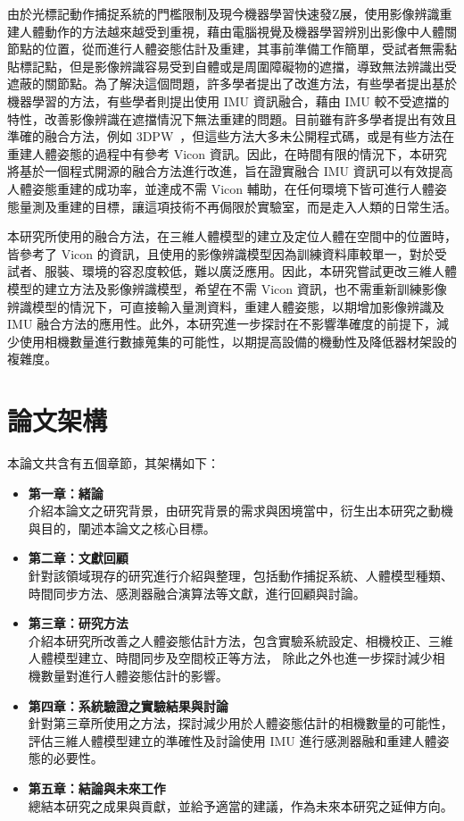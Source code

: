 由於光標記動作捕捉系統的門檻限制及現今機器學習快速發Z展，使用影像辨識重建人體動作的方法越來越受到重視，藉由電腦視覺及機器學習辨別出影像中人體關節點的位置，從而進行人體姿態估計及重建，其事前準備工作簡單，受試者無需黏貼標記點，但是影像辨識容易受到自體或是周圍障礙物的遮擋，導致無法辨識出受遮蔽的關節點。為了解決這個問題，許多學者提出了改進方法，有些學者提出基於機器學習的方法，有些學者則提出使用 IMU 資訊融合，藉由 IMU 較不受遮擋的特性，改善影像辨識在遮擋情況下無法重建的問題。目前雖有許多學者提出有效且準確的融合方法，例如 3DPW~\cite{vonMarcard2018}，但這些方法大多未公開程式碼，或是有些方法在重建人體姿態的過程中有參考 Vicon 資訊。因此，在時間有限的情況下，本研究將基於一個程式開源的融合方法進行改進，旨在證實融合 IMU 資訊可以有效提高人體姿態重建的成功率，並達成不需 Vicon 輔助，在任何環境下皆可進行人體姿態量測及重建的目標，讓這項技術不再侷限於實驗室，而是走入人類的日常生活。

本研究所使用的融合方法，在三維人體模型的建立及定位人體在空間中的位置時，皆參考了 Vicon 的資訊，且使用的影像辨識模型因為訓練資料庫較單一，對於受試者、服裝、環境的容忍度較低，難以廣泛應用。因此，本研究嘗試更改三維人體模型的建立方法及影像辨識模型，希望在不需 Vicon 資訊，也不需重新訓練影像辨識模型的情況下，可直接輸入量測資料，重建人體姿態，以期增加影像辨識及 IMU 融合方法的應用性。此外，本研究進一步探討在不影響準確度的前提下，減少使用相機數量進行數據蒐集的可能性，以期提高設備的機動性及降低器材架設的複雜度。


\section{論文架構}
本論文共含有五個章節，其架構如下：

\begin{itemize}
    \item \textbf{第一章：緒論}
    \\ 介紹本論文之研究背景，由研究背景的需求與困境當中，衍生出本研究之動機與目的，闡述本論文之核心目標。
    \item \textbf{第二章：文獻回顧}
    \\ 針對該領域現存的研究進行介紹與整理，包括動作捕捉系統、人體模型種類、時間同步方法、感測器融合演算法等文獻，進行回顧與討論。
    \item \textbf{第三章：研究方法}
    \\ 介紹本研究所改善之人體姿態估計方法，包含實驗系統設定、相機校正、三維人體模型建立、時間同步及空間校正等方法，
    除此之外也進一步探討減少相機數量對進行人體姿態估計的影響。
    \item \textbf{第四章：系統驗證之實驗結果與討論}
    \\ 針對第三章所使用之方法，探討減少用於人體姿態估計的相機數量的可能性，評估三維人體模型建立的準確性及討論使用 IMU 進行感測器融和重建人體姿態的必要性。
    \item \textbf{第五章：結論與未來工作}
    \\ 總結本研究之成果與貢獻，並給予適當的建議，作為未來本研究之延伸方向。
\end{itemize}

\clearpage
